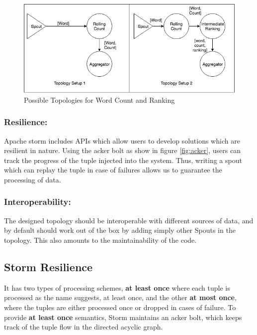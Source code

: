 \documentclass[runningheads,a4paper]{llncs}[2015/06/24]
\begin{document}
\begin{figure}
  \begin{center}
    \includegraphics[width=\textwidth]{ranking.png}
    \caption{Possible Topologies for Word Count and Ranking}
    \label{fig:ranking}
   \end{center}
\end{figure}

\subsubsection{Resilience:} Apache storm includes APIs which allow users to develop solutions which are resilient in nature. Using the acker bolt as show in figure \ref{fig:acker}, users can track the progress of the tuple injected into the system. Thus, writing a spout which can replay the tuple in case of failures allows us to guarantee the processing of data.

\subsubsection{Interoperability:} The designed topology should be interoperable with different sources of data, and by default should work out of the box by adding simply other Spouts in the topology. This also amounts to the maintainability of the code.

\subsection{Storm Resilience}
\label{sec:resilience}

It has two types of processing schemes, \textbf{at least once} where each tuple is processed as the name suggests, at least once, and the other \textbf{at most once}, where the tuples are either processed once or dropped in cases of failure. To provide \textbf{at least once} semantics, Storm maintains an acker bolt, which keeps track of the tuple flow in the directed acyclic graph.
\end{document}
